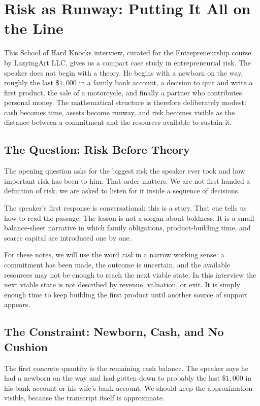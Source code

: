\chapter{Risk as Runway: Putting It All on the Line}

This School of Hard Knocks interview, curated for the Entrepreneurship course by LazyingArt LLC, gives us a compact case study in entrepreneurial risk. The speaker does not begin with a theory. He begins with a newborn on the way, roughly the last \(\$1{,}000\) in a family bank account, a decision to quit and write a first product, the sale of a motorcycle, and finally a partner who contributes personal money. The mathematical structure is therefore deliberately modest: cash becomes time, assets become runway, and risk becomes visible as the distance between a commitment and the resources available to sustain it.

\section{The Question: Risk Before Theory}

The opening question asks for the biggest risk the speaker ever took and how important risk has been to him. That order matters. We are not first handed a definition of risk; we are asked to listen for it inside a sequence of decisions.

The speaker's first response is conversational: this is a story. That cue tells us how to read the passage. The lesson is not a slogan about boldness. It is a small balance-sheet narrative in which family obligations, product-building time, and scarce capital are introduced one by one.

For these notes, we will use the word \emph{risk} in a narrow working sense: a commitment has been made, the outcome is uncertain, and the available resources may not be enough to reach the next viable state. In this interview the next viable state is not described by revenue, valuation, or exit. It is simply enough time to keep building the first product until another source of support appears.

\section{The Constraint: Newborn, Cash, and No Cushion}

The first concrete quantity is the remaining cash balance. The speaker says he had a newborn on the way and had gotten down to probably the last \(\$1{,}000\) in his bank account or his wife's bank account. We should keep the approximation visible, because the transcript itself is approximate.

